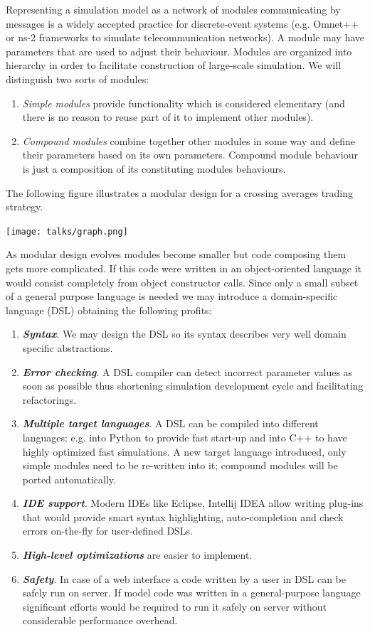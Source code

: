 \documentclass[a4paper,11pt]{article}
\begin{document}
Representing a simulation model as a network of modules communicating
by messages is a widely accepted practice for discrete-event systems (e.g.
Omnet++ or ns-2 frameworks to simulate telecommunication networks).
A module may have parameters that are used to adjust their behaviour.
Modules are organized into hierarchy in order to facilitate construction of
large-scale simulation.
We will distinguish two sorts of modules:
\begin{enumerate}
\item \emph{Simple modules} provide functionality which is considered elementary
(and there is no reason to reuse part of it to implement other
modules).
\item \emph{Compound modules} combine together other modules in some way
and define their parameters based on its own parameters. Compound
module behaviour is just a composition of its constituting modules
behaviours.
\end{enumerate}
The following figure illustrates a modular design for a crossing averages trading strategy.

\centerline{\texttt{[image: talks/graph.png]}}

As modular design evolves modules become smaller but code composing them gets more complicated. 
If this code were written in an object-oriented language it would consist completely from object constructor calls. Since only a small subset of a general purpose language is needed we may introduce a domain-specific language (DSL) obtaining the following profits:

\begin{enumerate}
\item \textbf{\textit{Syntax}}. We may design the DSL so its syntax describes very well domain specific abstractions.
\item \textbf{\textit{Error checking}}. A DSL compiler can detect incorrect parameter values as soon as possible thus shortening simulation development cycle and facilitating refactorings.
\item \textbf{\textit{Multiple target languages}}. A DSL can be compiled into different languages: e.g. into Python to provide fast start-up and into C++ to have highly optimized fast simulations. A new target language introduced, only simple modules need to be re-written into it; compound modules will be ported automatically.
  \item \textbf{\textit{IDE support}}. Modern IDEs like Eclipse, Intellij IDEA allow writing plug-ins that would provide smart syntax highlighting, auto-completion and check errors on-the-fly for user-defined DSLs.
  \item \textbf{\textit{High-level optimizations}} are easier to implement. 
  \item \textbf{\textit{Safety}}. In case of a web interface a code written by a user in DSL can be safely run on server. If model code was written in a general-purpose language significant efforts would be required to run it safely on server without considerable performance overhead.
\end{enumerate}
\end{document}
